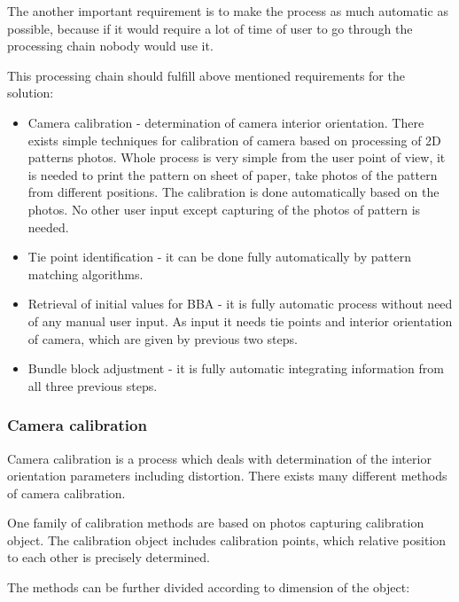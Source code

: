 \documentclass[a4paper,12pt]{article}
\begin{document}
The another important requirement is to make the process as much automatic as possible, because 
if it would require a lot of time of user to go through the processing chain nobody would use it.

This processing chain should fulfill above mentioned requirements for the solution:

\begin{itemize}
\item Camera calibration - determination of camera interior orientation. There exists simple techniques for calibration
of camera based on processing of 2D patterns photos. Whole process is very simple from the user point of view, it is needed 
to print the pattern on sheet of paper, take photos of the pattern from different positions. The calibration 
is done automatically based on the photos. No other user input except  capturing of the photos of pattern is needed.
\item Tie point identification - it can be done fully automatically by pattern matching algorithms.
\item Retrieval of initial values for BBA - it is fully automatic process without need of any manual user input.
As input it needs tie points and interior orientation of camera, which are given by previous two steps.
\item Bundle block adjustment - it is fully automatic integrating information from all three previous steps.
\end{itemize}

 
\subsubsection{Camera calibration}


Camera calibration is a process which deals with determination of the interior orientation parameters including distortion.
There exists many different methods of camera calibration.



One family of calibration methods are based on photos capturing calibration object.
The calibration object includes calibration points, which relative position to each other is  precisely determined.  

The methods can be further divided according to dimension of the object:
\end{document}
